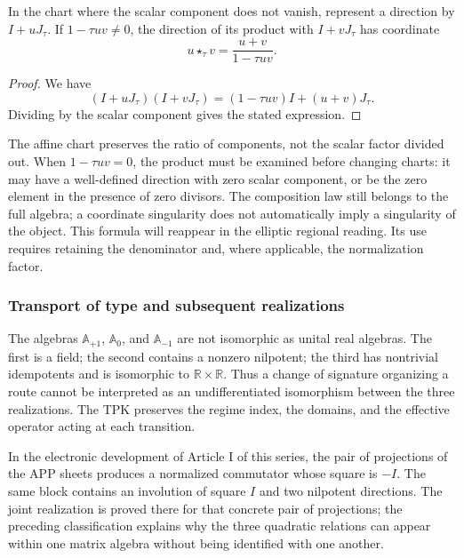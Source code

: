 \begin{proposition}
\label{trit-ampl-prop-pendientes}
In the chart where the scalar component does not vanish, represent a
direction by \(I+uJ_\tau\). If \(1-\tau uv\ne0\), the direction of its
product with \(I+vJ_\tau\) has coordinate
\[
 u\star_\tau v=\frac{u+v}{1-\tau uv}.
\]
\end{proposition}
\begin{proof}
We have
\[
 (I+uJ_\tau)(I+vJ_\tau)
   =(1-\tau uv)I+(u+v)J_\tau.
\]
Dividing by the scalar component gives the stated expression.
\end{proof}

The affine chart preserves the ratio of components, not the scalar factor
divided out. When \(1-\tau uv=0\), the product must be examined before
changing charts: it may have a well-defined direction with zero scalar
component, or be the zero element in the presence of zero divisors.
The composition law still belongs to the full algebra; a coordinate
singularity does not automatically imply a singularity of the object.
This formula will reappear in the elliptic regional reading. Its use
requires retaining the denominator and, where applicable, the normalization factor.

\subsubsection{Transport of type and subsequent realizations}
\label{trit-ampl-puentes}

The algebras \(\mathbb A_{+1}\), \(\mathbb A_0\), and
\(\mathbb A_{-1}\) are not isomorphic as unital real algebras.
The first is a field; the second contains a nonzero nilpotent; the
third has nontrivial idempotents and is isomorphic to
\(\mathbb R\times\mathbb R\). Thus a change of signature organizing a
route cannot be interpreted as an undifferentiated isomorphism between
the three realizations. The TPK preserves the regime index, the domains,
and the effective operator acting at each transition.

In the electronic development of Article I of this series, the pair of projections of the APP sheets
produces a normalized commutator whose square is \(-I\). The same block
contains an involution of square \(I\) and two nilpotent directions.
The joint realization is proved there for that concrete pair of projections;
the preceding classification explains why the three quadratic relations
can appear within one matrix algebra without being identified with one another.

